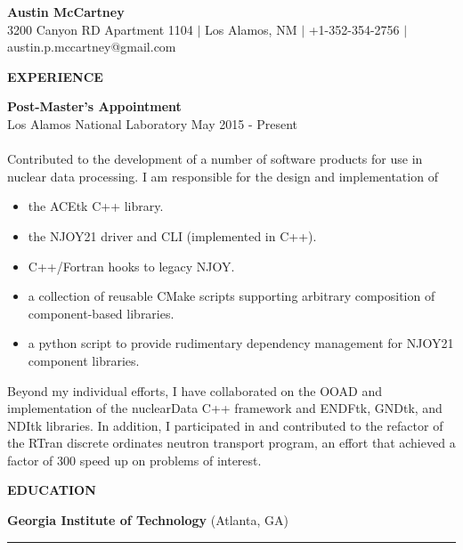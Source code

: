 \documentclass[legalpaper]{article}
\begin{document}
\setlength\multicolsep{0pt}
\pagestyle{empty}

\begin{center}
  {\Large \textbf{Austin McCartney}\\}
  3200 Canyon RD Apartment 1104 $\vert$ Los Alamos, NM $\vert$ +1-352-354-2756 $\vert$ austin.p.mccartney@gmail.com
\end{center}

\begin{center}
  \begin{shaded}
    { \color{white} \textbf{EXPERIENCE}}
  \end{shaded}
\end{center}

\textbf{Post-Master's Appointment}\\
Los Alamos National Laboratory \hfill May 2015 - Present\\
~\\
Contributed to the development of a number of software products for use in nuclear data processing. I am responsible for the design and implementation of

\begin{itemize}[noitemsep, before={\vspace*{-0.5\baselineskip}}]
\item the ACEtk C++ library.
\item the NJOY21 driver and CLI (implemented in C++).
\item C++/Fortran hooks to legacy NJOY.
\item a collection of reusable CMake scripts supporting arbitrary composition of component-based libraries.
\item a python script to provide rudimentary dependency management for NJOY21 component libraries.
\end{itemize}

Beyond my individual efforts, I have collaborated on the OOAD and implementation of the nuclearData C++ framework and ENDFtk, GNDtk, and NDItk libraries.
In addition, I participated in and contributed to the refactor of the RTran discrete ordinates neutron transport program, an effort that achieved a factor of 300 speed up on problems of interest.
\begin{center}
  \begin{shaded}
    { \color{white} \textbf{EDUCATION}}
  \end{shaded}
\end{center}
\textbf{Georgia Institute of Technology} (Atlanta, GA)\hrule \vspace{1mm}
\end{document}
